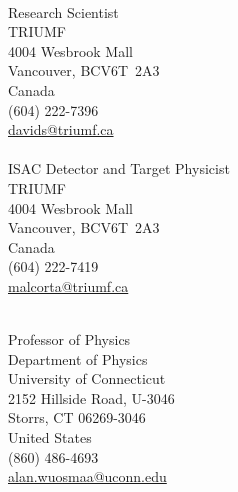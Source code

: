 {\setlength{\parindent}{0in}

\begin{multicols}{2}

  
\\
Research Scientist\\
TRIUMF\\
4004 Wesbrook Mall\\
Vancouver, BC\hspace{6pt}V6T~2A3\\
Canada\\
(604) 222-7396\\
\href{mailto:davids@triumf.ca}{davids@triumf.ca}\\

\\
ISAC Detector and Target Physicist\\
TRIUMF\\
4004 Wesbrook Mall\\
Vancouver, BC\hspace{6pt}V6T~2A3\\
Canada\\
(604) 222-7419\\
\href{mailto:malcorta@triumf.ca}{malcorta@triumf.ca}\\
\columnbreak

\\
Professor of Physics\\
Department of Physics\\
University of Connecticut\\
2152 Hillside Road, U-3046\\
Storrs,  CT 06269-3046\\
United States\\
(860) 486-4693\\
\href{mailto:alan.wuosmaa@uconn.edu}{alan.wuosmaa@uconn.edu}\\



\end{multicols}}
